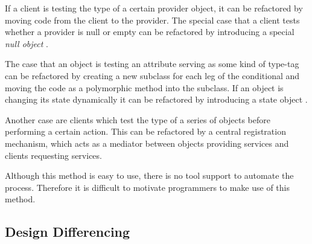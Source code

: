 \documentclass[conference,compsoc,a4paper]{IEEEtran}
\newcommand{\code}[1]{{\small\ttfamily #1}}
\begin{document}
If a client is testing the type of a certain provider object, it can be refactored by moving code from the client to 
the provider. The special case that a client tests whether a provider is \code{null} or empty can be refactored by 
introducing a special \emph{null object} \cite{nullobject}.

The case that an object is testing an attribute serving as some kind of type-tag can be refactored by creating a new 
subclass for each leg of the conditional and moving the code as a polymorphic method into the subclass. If an object is 
changing its state dynamically it can be refactored by introducing a state object \cite[pp.~305--313]{designpatterns}.

Another case are clients which test the type of a series of objects before performing a certain action. This can be 
refactored by a central registration mechanism, which acts as a mediator between objects providing services and clients 
requesting services.

Although this method is easy to use, there is no tool support to automate the process. Therefore it is difficult to 
motivate programmers to make use of this method.

\subsection{Design Differencing}
\end{document}
